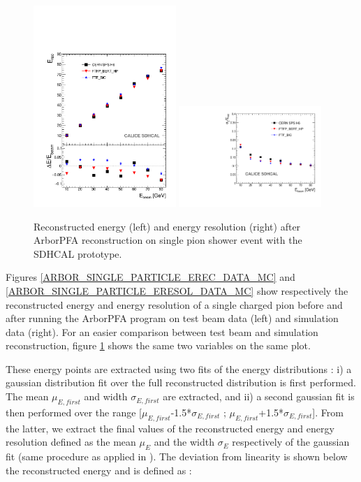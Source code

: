 \documentclass[cits]{JINST}
\begin{document}
\begin{figure}[!h]
  \begin{center}
    \includegraphics[width=0.48\textwidth]{plots/SingleParticle/CALICESDHCAL/MC_DATA_COMP/Single_MC_DATA_COMP_ERec.pdf}
    \includegraphics[width=0.48\textwidth]{plots/SingleParticle/CALICESDHCAL/MC_DATA_COMP/Single_MC_DATA_COMP_EResol.pdf} \\
  \end{center}
  \caption{\label{ARBOR_SINGLE_PARTICLE_EREC_AND_ERESOL_COMP} Reconstructed energy (left) and energy resolution (right) after ArborPFA reconstruction on single pion shower event with the SDHCAL prototype.}
\end{figure}

Figures \ref{ARBOR_SINGLE_PARTICLE_EREC_DATA_MC} and \ref{ARBOR_SINGLE_PARTICLE_ERESOL_DATA_MC} show respectively the reconstructed energy and energy resolution of a single charged pion before and after running the ArborPFA program on test beam data (left) and simulation data (right). For an easier comparison between test beam and simulation reconstruction, figure \ref{ARBOR_SINGLE_PARTICLE_EREC_AND_ERESOL_COMP} shows the same two variables on the same plot.

These energy points are extracted using two fits of the energy distributions : i) a gaussian distribution fit over the full reconstructed distribution is first performed. The mean $\mu_{E,first}$ and width $\sigma_{E,first}$ are extracted, and ii) a second gaussian fit is then performed over the range [$\mu_{E,first}$-1.5*$\sigma_{E,first}$ ; $\mu_{E,first}$+1.5*$\sigma_{E,first}$]. From the latter, we extract the final values of the reconstructed energy and energy resolution defined as the mean $\mu_E$ and the width $\sigma_E$ respectively of the gaussian fit (same procedure as applied in \cite{sdhcal-paper}). 
The deviation from linearity is shown below the reconstructed energy and is defined as :
\end{document}
